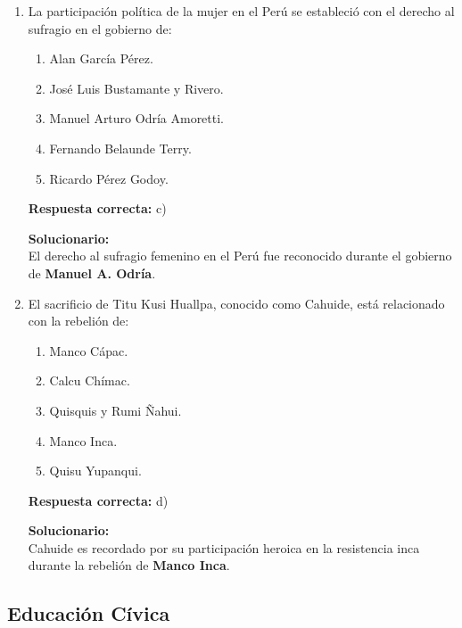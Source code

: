 \begin{enumerate}
	
	
	\item La participación política de la mujer en el Perú se estableció con el derecho al sufragio en el gobierno de:
	\begin{enumerate}[label=\alph*)]
		\item Alan García Pérez.
		\item José Luis Bustamante y Rivero.
		\item Manuel Arturo Odría Amoretti.
		\item Fernando Belaunde Terry.
		\item Ricardo Pérez Godoy.
	\end{enumerate}
	\textbf{Respuesta correcta:} c)
	
	\vspace{2mm}
	\textbf{Solucionario:}\\
	El derecho al sufragio femenino en el Perú fue reconocido durante el gobierno de \textbf{Manuel A. Odría}.
	
	\vspace{6mm}
	
	\item El sacrificio de Titu Kusi Huallpa, conocido como Cahuide, está relacionado con la rebelión de:
	\begin{enumerate}[label=\alph*)]
		\item Manco Cápac.
		\item Calcu Chímac.
		\item Quisquis y Rumi Ñahui.
		\item Manco Inca.
		\item Quisu Yupanqui.
	\end{enumerate}
	\textbf{Respuesta correcta:} d)
	
	\vspace{2mm}
	\textbf{Solucionario:}\\
	Cahuide es recordado por su participación heroica en la resistencia inca durante la rebelión de \textbf{Manco Inca}.
	
	\vspace{6mm}
	
\end{enumerate}

\subsection*{Educación Cívica}

